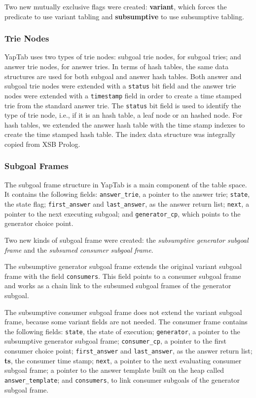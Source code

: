 Two new mutually exclusive flags were created: \textbf{variant},
which forces the predicate to use variant tabling and \textbf{subsumptive} to use subsumptive tabling.

\subsubsection{Trie Nodes}

YapTab uses two types of trie nodes: subgoal trie nodes, for subgoal tries; and answer trie nodes, for
answer tries. In terms of hash tables, the same data structures are used for both subgoal and answer
hash tables. Both answer and subgoal trie nodes were extended with a \texttt{status}
bit field and the answer trie nodes were extended with a \texttt{timestamp} field in order to create a
time stamped trie from the standard answer trie.
The \texttt{status} bit field is used to identify the type of trie node, i.e., if it is
an hash table, a leaf node or an hashed node.
For hash tables, we extended the answer hash table with the time stamp indexes to create the
time stamped hash table. The index data structure was integrally copied from XSB Prolog.

\subsubsection{Subgoal Frames}

The subgoal frame structure in YapTab is a main component of the table space.
It contains the following fields: \texttt{answer\_trie}, a pointer to the answer trie;
\texttt{state}, the state flag; \texttt{first\_answer} and \texttt{last\_answer},
as the answer return list; \texttt{next}, a pointer to the next executing subgoal;
and \texttt{generator\_cp}, which points to the generator choice point.

Two new kinds of subgoal frame were created: the \textit{subsumptive generator subgoal frame} and
the \textit{subsumed consumer subgoal frame}.

The subsumptive generator subgoal frame extends the original variant subgoal frame
with the field \texttt{consumers}. This field points to a consumer subgoal frame and works
as a chain link to the subsumed subgoal frames of the generator subgoal.

The subsumptive consumer subgoal frame does not extend the variant subgoal frame, because
some variant fields are not needed.
The consumer frame contains the following fields: \texttt{state}, the state of execution;
\texttt{generator}, a pointer to the subsumptive generator subgoal frame; \texttt{consumer\_cp},
a pointer to the first consumer choice point; \texttt{first\_answer} and \texttt{last\_answer},
as the answer return list; \textbf{ts}, the consumer time stamp;
\texttt{next}, a pointer to the next evaluating consumer subgoal frame;
a pointer to the answer template built on the heap called \texttt{answer\_template}; and \texttt{consumers},
to link consumer subgoals of the generator subgoal frame.

